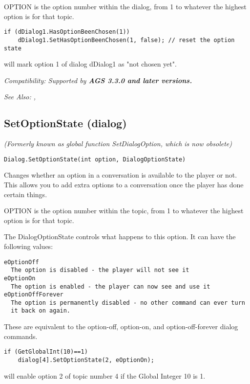 OPTION is the option number within the dialog, from 1 to whatever the
highest option is for that topic.

\begin{verbatim}
if (dDialog1.HasOptionBeenChosen(1))
    dDialog1.SetHasOptionBeenChosen(1, false); // reset the option state
\end{verbatim}
will mark option 1 of dialog dDialog1 as "not chosen yet".

\it{Compatibility:} Supported by \bf{AGS 3.3.0} and later versions.

\it{See Also:} ,

\subsection{SetOptionState (dialog)}\label{Dialog.SetOptionState}%

\it{(Formerly known as global function SetDialogOption, which is now obsolete)}

\begin{verbatim}
Dialog.SetOptionState(int option, DialogOptionState)
\end{verbatim}
Changes whether an option in a conversation is available to the player or
not. This allows you to add extra options to a conversation once the player
has done certain things.

OPTION is the option number within the topic, from 1 to whatever the
highest option is for that topic.

The DialogOptionState controls what happens to this option. It can have the following
values:
\begin{verbatim}
eOptionOff
  The option is disabled - the player will not see it
eOptionOn
  The option is enabled - the player can now see and use it
eOptionOffForever
  The option is permanently disabled - no other command can ever turn
  it back on again.
\end{verbatim}
These are equivalent to the option-off, option-on, and option-off-forever
dialog commands.

\begin{verbatim}
if (GetGlobalInt(10)==1)
    dialog[4].SetOptionState(2, eOptionOn);
\end{verbatim}
will enable option 2 of topic number 4 if the Global Integer 10 is 1.

